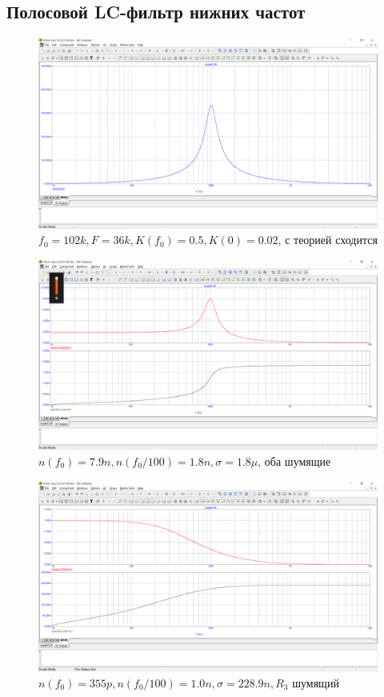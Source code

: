\documentclass[a4paper, 12pt]{article}%
\begin{document}
\subsection{Полосовой LC-фильтр нижних частот}
\FloatBarrier
\begin{figure}[h!]
    \centering
    \includegraphics[scale = 0.4 \textwidth]{images/mod4_3_1.png}
    \caption{$f_0 = 102k, F = 36k, K(f_0) = 0.5, K(0) = 0.02$, с теорией сходится}
    \label{fig:m431}
\end{figure}

\begin{figure}[h!]
    \centering
    \includegraphics[scale = 0.4 \textwidth]{images/mod4_3_2_1.png}
    \caption{$n(f_0) = 7.9n, n(f_0/100) = 1.8n, \sigma = 1.8\mu$, оба шумящие}
    \label{fig:m4321}
\end{figure}

\begin{figure}[h!]
    \centering
    \includegraphics[scale = 0.4 \textwidth]{images/mod4_3_2_2.png}
    \caption{$n(f_0) = 355p, n(f_0/100) = 1.0n, \sigma = 228.9n, R_3$ шумящий}
    \label{fig:m4322}
\end{figure}
\end{document}
